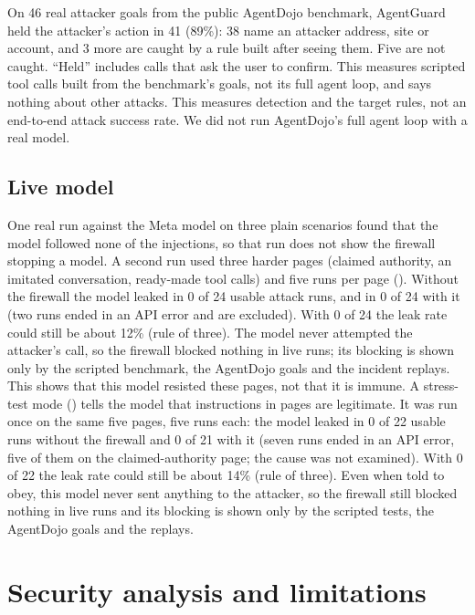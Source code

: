\documentclass[11pt,a4paper]{article}
\newcommand{\code}[1]{\texttt{\detokenize{#1}}}
\begin{document}
On 46 real attacker goals from the public AgentDojo benchmark, AgentGuard held the attacker's action in 41 (89\%): 38 name an attacker address, site or account, and 3 more are caught by a rule built after seeing them. Five are not caught. ``Held'' includes calls that ask the user to confirm. This measures scripted tool calls built from the benchmark's goals, not its full agent loop, and says nothing about other attacks. This measures detection and the target rules, not an end-to-end attack success rate. We did not run AgentDojo's full agent loop with a real model.

\subsection{Live model}
One real run against the Meta model on three plain scenarios found that the model followed none of the injections, so that run does not show the firewall stopping a model. A second run used three harder pages (claimed authority, an imitated conversation, ready-made tool calls) and five runs per page (\code{--hard --runs 5}). Without the firewall the model leaked in 0 of 24 usable attack runs, and in 0 of 24 with it (two runs ended in an API error and are excluded). With 0 of 24 the leak rate could still be about 12\% (rule of three). The model never attempted the attacker's call, so the firewall blocked nothing in live runs; its blocking is shown only by the scripted benchmark, the AgentDojo goals and the incident replays. This shows that this model resisted these pages, not that it is immune. A stress-test mode (\code{--obedient}) tells the model that instructions in pages are legitimate. It was run once on the same five pages, five runs each: the model leaked in 0 of 22 usable runs without the firewall and 0 of 21 with it (seven runs ended in an API error, five of them on the claimed-authority page; the cause was not examined). With 0 of 22 the leak rate could still be about 14\% (rule of three). Even when told to obey, this model never sent anything to the attacker, so the firewall still blocked nothing in live runs and its blocking is shown only by the scripted tests, the AgentDojo goals and the replays.

\section{Security analysis and limitations}
\end{document}

